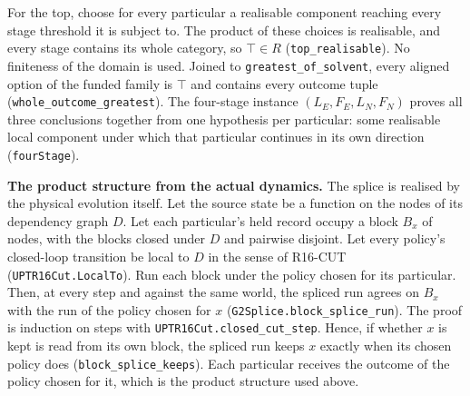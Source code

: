 \documentclass[
]{article}
\begin{document}
For the top, choose for every particular a realisable component reaching
every stage threshold it is subject to. The product of these choices is
realisable, and every stage contains its whole category, so
\(\top\in R\) (\texttt{top\_realisable}). No finiteness of the domain is
used. Joined to
\texttt{g\allowbreak{}r\allowbreak{}e\allowbreak{}a\allowbreak{}t\allowbreak{}e\allowbreak{}s\allowbreak{}t\allowbreak{}\_\allowbreak{}o\allowbreak{}f\allowbreak{}\_\allowbreak{}s\allowbreak{}o\allowbreak{}l\allowbreak{}v\allowbreak{}e\allowbreak{}n\allowbreak{}t},
every aligned option of the funded family is \(\top\) and contains every
outcome tuple
(\texttt{w\allowbreak{}h\allowbreak{}o\allowbreak{}l\allowbreak{}e\allowbreak{}\_\allowbreak{}o\allowbreak{}u\allowbreak{}t\allowbreak{}c\allowbreak{}o\allowbreak{}m\allowbreak{}e\allowbreak{}\_\allowbreak{}g\allowbreak{}r\allowbreak{}e\allowbreak{}a\allowbreak{}t\allowbreak{}e\allowbreak{}s\allowbreak{}t}).
The four-stage instance \((L_E,F_E,L_N,F_N)\) proves all three
conclusions together from one hypothesis per particular: some realisable
local component under which that particular continues in its own
direction (\texttt{fourStage}).

\textbf{The product structure from the actual dynamics.} The splice is
realised by the physical evolution itself. Let the source state be a
function on the nodes of its dependency graph \(D\). Let each
particular's held record occupy a block \(B_x\) of nodes, with the
blocks closed under \(D\) and pairwise disjoint. Let every policy's
closed-loop transition be local to \(D\) in the sense of R16-CUT
(\texttt{U\allowbreak{}P\allowbreak{}T\allowbreak{}R\allowbreak{}1\allowbreak{}6\allowbreak{}C\allowbreak{}u\allowbreak{}t\allowbreak{}.\allowbreak{}L\allowbreak{}o\allowbreak{}c\allowbreak{}a\allowbreak{}l\allowbreak{}T\allowbreak{}o}).
Run each block under the policy chosen for its particular. Then, at
every step and against the same world, the spliced run agrees on \(B_x\)
with the run of the policy chosen for \(x\)
(\texttt{G\allowbreak{}2\allowbreak{}S\allowbreak{}p\allowbreak{}l\allowbreak{}i\allowbreak{}c\allowbreak{}e\allowbreak{}.\allowbreak{}b\allowbreak{}l\allowbreak{}o\allowbreak{}c\allowbreak{}k\allowbreak{}\_\allowbreak{}s\allowbreak{}p\allowbreak{}l\allowbreak{}i\allowbreak{}c\allowbreak{}e\allowbreak{}\_\allowbreak{}r\allowbreak{}u\allowbreak{}n}).
The proof is induction on steps with
\texttt{U\allowbreak{}P\allowbreak{}T\allowbreak{}R\allowbreak{}1\allowbreak{}6\allowbreak{}C\allowbreak{}u\allowbreak{}t\allowbreak{}.\allowbreak{}c\allowbreak{}l\allowbreak{}o\allowbreak{}s\allowbreak{}e\allowbreak{}d\allowbreak{}\_\allowbreak{}c\allowbreak{}u\allowbreak{}t\allowbreak{}\_\allowbreak{}s\allowbreak{}t\allowbreak{}e\allowbreak{}p}.
Hence, if whether \(x\) is kept is read from its own block, the spliced
run keeps \(x\) exactly when its chosen policy does
(\texttt{b\allowbreak{}l\allowbreak{}o\allowbreak{}c\allowbreak{}k\allowbreak{}\_\allowbreak{}s\allowbreak{}p\allowbreak{}l\allowbreak{}i\allowbreak{}c\allowbreak{}e\allowbreak{}\_\allowbreak{}k\allowbreak{}e\allowbreak{}e\allowbreak{}p\allowbreak{}s}).
Each particular receives the outcome of the policy chosen for it, which
is the product structure used above.
\end{document}
